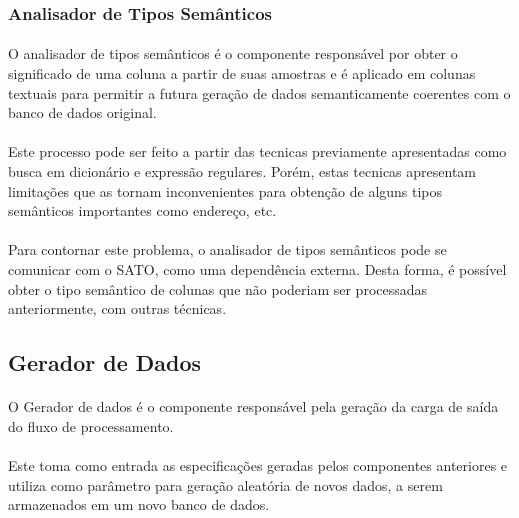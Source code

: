 \subsubsection{Analisador de Tipos Semânticos}

\paragraph{} O analisador de tipos semânticos é o componente responsável por obter o significado de uma coluna a partir de suas amostras e é aplicado em colunas textuais para permitir a futura geração de dados semanticamente coerentes com o banco de dados original.

\paragraph{} Este processo pode ser feito a partir das tecnicas previamente apresentadas como busca em dicionário e expressão regulares. Porém, estas tecnicas apresentam limitações que as tornam inconvenientes para obtenção de alguns tipos semânticos importantes como endereço, etc.

\paragraph{} Para contornar este problema, o analisador de tipos semânticos pode se comunicar com o SATO, como uma dependência externa. Desta forma, é possível obter o tipo semântico de colunas que não poderiam ser processadas anteriormente, com outras técnicas.

\subsection{Gerador de Dados}

\paragraph{} O Gerador de dados é o componente responsável pela geração da carga de saída do fluxo de processamento. 

\paragraph{} Este toma como entrada as especificações geradas pelos componentes anteriores e utiliza como parâmetro para geração aleatória de novos dados, a serem armazenados em um novo banco de dados.

